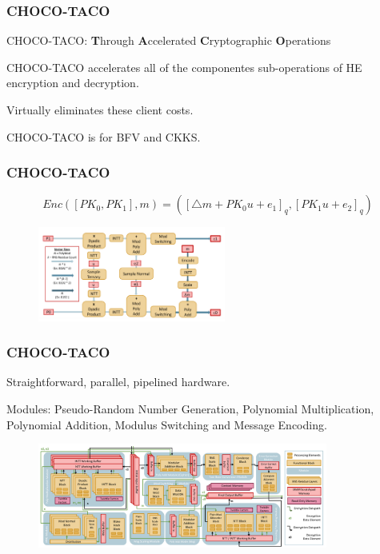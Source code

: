 \documentclass[10pt,handout]{beamer}
\begin{document}
\begin{frame}
\frametitle{CHOCO-TACO}
CHOCO-TACO: \textbf{T}hrough \textbf{A}ccelerated \textbf{C}ryptographic \textbf{O}perations

CHOCO-TACO accelerates all of the componentes sub-operations of HE encryption and decryption.

Virtually eliminates these client costs.

CHOCO-TACO is for BFV and CKKS.




\end{frame}


\begin{frame}
\frametitle{CHOCO-TACO}
\begin{equation}
    Enc([PK_0,PK_1],m) = ([\triangle m + PK_0u+e_1]_q, [PK_1u+e_2]_q)
\end{equation}

\begin{figure}
    \includegraphics[width=0.55\textwidth]{pipeline.png}
\end{figure}



\end{frame}


\begin{frame}
\frametitle{CHOCO-TACO}
 Straightforward, parallel, pipelined hardware.

 Modules: Pseudo-Random Number Generation, Polynomial Multiplication, Polynomial Addition, Modulus Switching and Message Encoding.


\begin{figure}
    \includegraphics[width=0.85\textwidth]{architecture.png}
\end{figure}


\end{frame}
\end{document}
